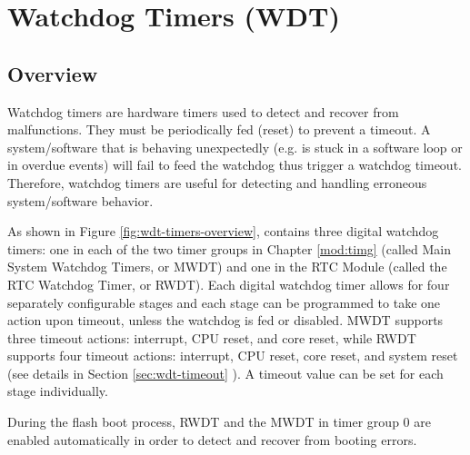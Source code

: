 \documentclass[main\_\_EN.tex]{subfiles}
\begin{document}

\ifglobal
\else
    {\let\clearpage\relax \listoftodos}
    {\let\clearpage\relax \listofdonetodos}
    \tableofcontents
\fi











\hypertarget{wdt}{}
\chapter{Watchdog Timers (WDT)}
\label{mod:wdt}

\section{Overview}

Watchdog timers are hardware timers used to detect and recover from malfunctions. They must be periodically fed (reset) to prevent a timeout. A system/software that is behaving unexpectedly (e.g. is stuck in a software loop or in overdue events) will fail to feed the watchdog thus trigger a watchdog timeout. Therefore, watchdog timers are useful for detecting and handling erroneous system/software behavior.

As shown in Figure \ref{fig:wdt-timers-overview}, \chipname{} contains three digital watchdog timers: one in each of the two timer groups in Chapter \ref{mod:timg} \textit{} (called Main System Watchdog Timers, or MWDT) and one in the RTC Module (called the RTC Watchdog Timer, or RWDT). Each digital watchdog timer allows for four separately configurable stages and each stage can be programmed to take one action upon timeout, unless the watchdog is fed or disabled. MWDT supports three timeout actions: interrupt, CPU reset, and core reset, while RWDT supports four timeout actions: interrupt, CPU reset, core reset, and system reset (see details in Section \ref{sec:wdt-timeout} \textit{}). A timeout value can be set for each stage individually.

During the flash boot process, RWDT and the MWDT in timer group 0 are enabled automatically in order to detect and recover from booting errors.
\end{document}
